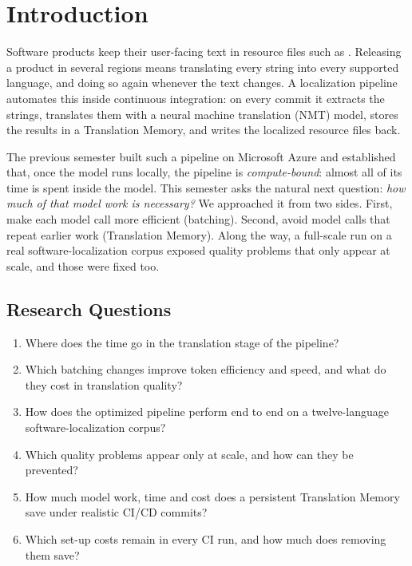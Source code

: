 \section{Introduction}
\label{sec:intro}

Software products keep their user-facing text in resource files such as . Releasing a product in several
regions means translating every string into every supported language, and doing so again whenever the text changes. A
localization pipeline automates this inside continuous integration: on every commit it extracts the strings, translates
them with a neural machine translation (NMT) model, stores the results in a Translation Memory, and writes the localized
resource files back.

The previous semester built such a pipeline on Microsoft Azure and established that, once the model runs locally, the
pipeline is \emph{compute-bound}: almost all of its time is spent inside the model. This semester asks the natural next
question: \emph{how much of that model work is necessary?} We approached it from two sides. First, make each model call
more efficient (batching). Second, avoid model calls that repeat earlier work (Translation Memory). Along the way, a
full-scale run on a real software-localization corpus exposed quality problems that only appear at scale, and those were
fixed too.

\subsection{Research Questions}
\begin{enumerate}[label=\textbf{RQ\arabic*.}, leftmargin=3.2em]
  \item Where does the time go in the translation stage of the pipeline?
  \item Which batching changes improve token efficiency and speed, and what do they cost in translation quality?
  \item How does the optimized pipeline perform end to end on a twelve-language software-localization corpus?
  \item Which quality problems appear only at scale, and how can they be prevented?
  \item How much model work, time and cost does a persistent Translation Memory save under realistic CI/CD commits?
  \item Which set-up costs remain in every CI run, and how much does removing them save?
\end{enumerate}

